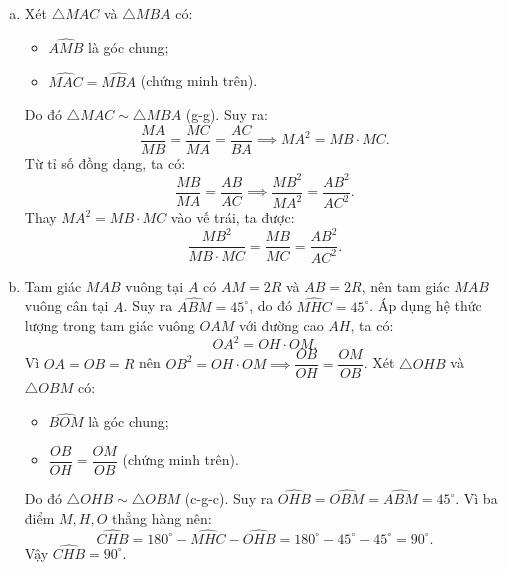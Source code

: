 \begin{bt}
{\begin{enumerate}[a)]
	$$\widehat{MAC} + \widehat{AMC} = 90^\circ \text{ và } \widehat{ABM} + \widehat{AMC} = 90^\circ \implies \widehat{MAC} = \widehat{ABM}.$$
	Suy ra $\widehat{MHC} = \widehat{ABM}$.
	\item Xét $\triangle MAC$ và $\triangle MBA$ có:
	\begin{itemize}
		\item $\widehat{AMB}$ là góc chung;
		\item $\widehat{MAC} = \widehat{MBA}$ (chứng minh trên).
	\end{itemize}
	Do đó $\triangle MAC \sim \triangle MBA$ (g-g).
	Suy ra:
	$$\dfrac{MA}{MB} = \dfrac{MC}{MA} = \dfrac{AC}{BA} \implies MA^2 = MB \cdot MC.$$
	Từ tỉ số đồng dạng, ta có:
	$$\dfrac{MB}{MA} = \dfrac{AB}{AC} \implies \dfrac{MB^2}{MA^2} = \dfrac{AB^2}{AC^2}.$$
	Thay $MA^2 = MB \cdot MC$ vào vế trái, ta được:
	$$\dfrac{MB^2}{MB \cdot MC} = \dfrac{MB}{MC} = \dfrac{AB^2}{AC^2}.$$
	\item Tam giác $MAB$ vuông tại $A$ có $AM = 2R$ và $AB = 2R$, nên tam giác $MAB$ vuông cân tại $A$.
	Suy ra $\widehat{ABM} = 45^\circ$, do đó $\widehat{MHC} = 45^\circ$.
	Áp dụng hệ thức lượng trong tam giác vuông $OAM$ với đường cao $AH$, ta có:
	$$OA^2 = OH \cdot OM.$$
	Vì $OA = OB = R$ nên $OB^2 = OH \cdot OM \implies \dfrac{OB}{OH} = \dfrac{OM}{OB}$.
	Xét $\triangle OHB$ và $\triangle OBM$ có:
	\begin{itemize}
		\item $\widehat{BOM}$ là góc chung;
		\item $\dfrac{OB}{OH} = \dfrac{OM}{OB}$ (chứng minh trên).
	\end{itemize}
	Do đó $\triangle OHB \sim \triangle OBM$ (c-g-c).
	Suy ra $\widehat{OHB} = \widehat{OBM} = \widehat{ABM} = 45^\circ$.
	Vì ba điểm $M, H, O$ thẳng hàng nên:
	$$\widehat{CHB} = 180^\circ - \widehat{MHC} - \widehat{OHB} = 180^\circ - 45^\circ - 45^\circ = 90^\circ.$$
	Vậy $\widehat{CHB} = 90^\circ$.
\end{enumerate}
}
\end{bt}


